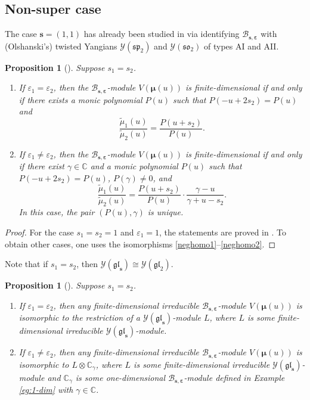 \documentclass[11pt,reqno]{amsart}
\numberwithin{equation}{section}
\newtheorem{prop}[thm]{Proposition}
\theoremstyle{definition}
\theoremstyle{remark}
\newcommand{\C}{\mathbb{C}}
\newcommand{\gl}{\mathfrak{gl}}
\newcommand{\bC}{\mathbb{C}}
\newcommand{\tl}{\tilde}
\newcommand{\BMN}{{\mathscr{B}_{\bm s,\bm \ve}}}
\newcommand{\ve}{\varepsilon}
\newcommand{\s}{{\bm s}}
\begin{document}
\subsection{Non-super case}
The case $\bm s=(1,1)$ has already been studied in \cite[Propositions 4.4, 4.5]{Molev2002reflection} via identifying $\BMN$ with (Olshanski's) twisted Yangians $\mathscr Y(\mathfrak{sp}_2)$ and $\mathscr Y(\mathfrak{so}_2)$ of types AI and AII.


\begin{prop}[{\cite{Molev2002reflection}}]\label{prop:iff-even}
Suppose $s_1=s_2$.
\begin{enumerate}
    \item If $\ve_1=\ve_2$, then the $\BMN$-module $V(\bm\mu(u))$ is finite-dimensional if and only if there exists a monic polynomial $P(u)$ such that $P(-u+2s_2)=P(u)$ and
\[
\frac{\tl \mu_1(u)}{\tl \mu_2(u)}=\frac{P(u+s_2)}{P(u)}.
\]
\item If $\ve_1\ne \ve_2$, then the $\BMN$-module $V(\bm\mu(u))$ is finite-dimensional if and only if there exist $\gamma\in \C$ and a monic polynomial $P(u)$ such that $P(-u+2s_2)=P(u)$, $P(\gamma)\ne 0$, and
\[
\frac{\tl \mu_1(u)}{\tl \mu_2(u)}=\frac{P(u+s_2)}{P(u)}\cdot \frac{\gamma -u}{\gamma+u-s_2}.
\]
In this case, the pair $(P(u),\gamma)$ is unique.
\end{enumerate}
\end{prop}
\begin{proof}
For the case $s_1=s_2=1$ and $\ve_1=1$, the statements are proved in \cite[Propositions 4.4]{Molev2002reflection}. To obtain other cases, one uses the isomorphisms \eqref{neghomo1}--\eqref{neghomo2}.
\end{proof}

Note that if $s_1=s_2$, then $\mathscr Y(\gl_\s)\cong \mathscr Y(\gl_2)$.

\begin{prop}[{\cite{Molev2002reflection}}]\label{prop:con-even}
Suppose $s_1=s_2$.
\begin{enumerate}
\item If $\ve_1=\ve_2$, then any finite-dimensional irreducible $\BMN$-module $V(\bm\mu(u))$ is isomorphic to the restriction of a $\mathscr Y(\gl_\s)$-module $L$, where $L$ is some finite-dimensional irreducible $\mathscr Y(\gl_\s)$-module.
\item If $\ve_1\ne \ve_2$, then any finite-dimensional irreducible $\BMN$-module $V(\bm\mu(u))$ is isomorphic to $L\otimes \bC_\gamma$, where $L$ is some finite-dimensional irreducible $\mathscr Y(\gl_\s)$-module and $\bC_\gamma$ is some one-dimensional $\BMN$-module defined in Example \ref{eg:1-dim} with $\gamma\in\bC$.
\end{enumerate}
\end{prop}
\end{document}
